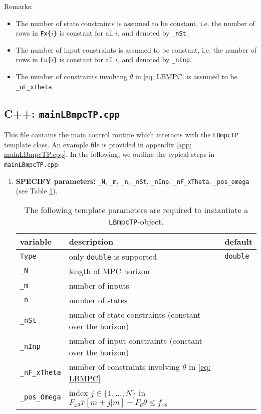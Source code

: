 \documentclass[letter]{article}
\begin{document}
\begin{sffamily}
\noindent
Remarks:
\begin{itemize}
	\item The number of state constraints is assumed to be constant, i.e. the number of rows in \texttt{Fx\{$i$\}} is constant for all $i$, and  denoted by \texttt{\_nSt}.
	\item The number of input constraints is assumed to be constant, i.e. the number of rows in \texttt{Fu\{$i$\}} is constant for all $i$, and denoted by \texttt{\_nInp}.
	\item The number of constraints involving $\theta$ in \eqref{eq: LBMPC} is assumed to be \texttt{\_nF\_xTheta}.
\end{itemize}


\subsection{C++: \texttt{mainLBmpcTP.cpp}}
This file contains the main control routine which interacts with the \texttt{LBmpcTP} template class. An example file is provided in appendix \ref{app: mainLBmpcTP.cpp}. In the following, we outline the typical steps in \texttt{mainLBmpcTP.cpp}:

\begin{enumerate}
	\item \textbf{SPECIFY parameters:} \texttt{\_N}, \texttt{\_m}, \texttt{\_n}, \texttt{\_nSt}, \texttt{\_nInp}, \texttt{\_nF\_xTheta}, \texttt{\_pos\_omega} (see Table \ref{tab: instantiateLBpmcTP}).
	
		\begin{table}[!htdp]
		\caption{The following template parameters are required to instantiate a \texttt{LBmpcTP}-object.}
		\begin{center}
		\begin{tabular}{|l|l|l|}\hline
		{
 			\bf variable} & description & default \\ \hline\hline
 
			\texttt{Type} & only \texttt{double} is supported & \texttt{double} \\ \hline
 			\texttt{\_N} & length of MPC horizon & \\ \hline
 			\texttt{\_m} & number of inputs & \\ \hline
 			\texttt{\_n} & number of states & \\ \hline 
 			\texttt{\_nSt} & number of state constraints (constant over the horizon) & \\ \hline
 			\texttt{\_nInp} & number of input constraints (constant over the horizon) & \\ \hline
	 		\texttt{\_nF\_xTheta} & number of constraints involving $\theta$ in \eqref{eq: LBMPC} & \\ \hline
 			\texttt{\_pos\_Omega} & index $j\in\{1,\ldots,N\}$ in $F_{x\theta}\bar{x}[m+j|m] + F_\theta \theta \leq f_{x\theta}$ & \\ \hline 
		\end{tabular}
		\end{center}
		\label{tab: instantiateLBpmcTP}
		\end{table}	
	

\end{enumerate}
\end{sffamily}
\end{document}
